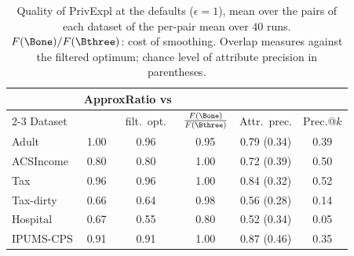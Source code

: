 \begin{table}[t]
\centering
\small
\caption{Quality of \textsf{PrivExpl} at the defaults ($\epsilon=1$), mean over the pairs of each dataset of the per-pair mean over $40$ runs. $F(\Bone)/F(\Bthree)$: cost of smoothing. Overlap measures against the filtered optimum; chance level of attribute precision in parentheses.}
\label{tab:quality}
\setlength{\tabcolsep}{3.5pt}
\begin{tabular}{@{}lccccc@{}}
\toprule
 & \multicolumn{2}{c}{ApproxRatio vs} & & & \\
\cmidrule(lr){2-3}
Dataset & \Bone{} & filt.\ opt. & $\frac{F(\Bone)}{F(\Bthree)}$ & Attr.\ prec. & Prec.@$k$\\
\midrule
Adult      & 1.00 & 0.96 & 0.95 & 0.79 (0.34) & 0.39\\
ACSIncome  & 0.80 & 0.80 & 1.00 & 0.72 (0.39) & 0.50\\
Tax        & 0.96 & 0.96 & 1.00 & 0.84 (0.32) & 0.52\\
Tax-dirty  & 0.66 & 0.64 & 0.98 & 0.56 (0.28) & 0.14\\
Hospital   & 0.67 & 0.55 & 0.80 & 0.52 (0.34) & 0.05\\
IPUMS-CPS  & 0.91 & 0.91 & 1.00 & 0.87 (0.46) & 0.35\\
\bottomrule
\end{tabular}
\end{table}

